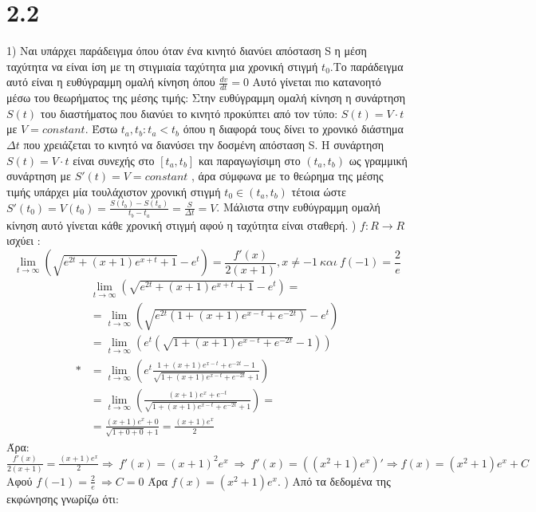 \documentclass{article}
\begin{document}
\section{2.2}
1) Ναι υπάρχει παράδειγμα όπου όταν ένα κινητό διανύει απόσταση S η μέση ταχύτητα να είναι ίση με τη στιγμιαία ταχύτητα μια χρονική στιγμή $t_0$.Το παράδειγμα αυτό είναι η ευθύγραμμη ομαλή κίνηση όπου $\frac{dv}{dt}=0$ Αυτό γίνεται πιο κατανοητό μέσω του θεωρήματος της μέσης τιμής: Στην ευθύγραμμη ομαλή κίνηση η συνάρτηση $S(t)$ του διαστήματος που διανύει το κινητό προκύπτει από τον τύπο: $S(t)=V\cdot t$ με $V=constant$. Έστω $t_a,t_b: t_a<t_b$ όπου η διαφορά τους δίνει το χρονικό διάστημα $Δt$ που χρειάζεται το κινητό να διανύσει την δοσμένη απόσταση S. Η συνάρτηση $S(t)=V\cdot t$ είναι συνεχής στο $[t_a,t_b]$ και παραγωγίσιμη στο $(t_a,t_b)$ ως γραμμική συνάρτηση με $S'(t)=V=constant$ , άρα σύμφωνα με το θεώρημα της μέσης τιμής υπάρχει μία τουλάχιστον χρονική στιγμή $t_0\in(t_a,t_b) $ τέτοια ώστε $S'(t_0)=V(t_0)=\frac{S(t_b)-S(t_a)}{t_b-t_a}=\frac{S}{Δt}=V$. Μάλιστα στην ευθύγραμμη ομαλή κίνηση αυτό γίνεται κάθε χρονική στιγμή αφού η ταχύτητα είναι σταθερή. ) $f:R \rightarrow R $ ισχύει :\newline 
$$\lim_{t\to\infty}(\sqrt{e^{2t} +(x+1)e^{x+t} + 1}-e^t)=\frac{f'(x)}{2(x+1)} , x\neq{-1}\: και\: f(-1)=\frac{2}{e}$$  \newline
\begin{align*}
&\lim_{t\to\infty}(\sqrt{e^{2t} +(x+1)e^{x+t} + 1}-e^t)= \\
&=\lim_{t\to\infty}(\sqrt{e^{2t}(1 +(x+1)e^{x-t} + e^{-2t})}-e^t) \\
&=\lim_{t\to\infty}(e^t(\sqrt{1+(x+1)e^{x-t}+e^{-2t}}-1)) \\*
&=\lim_{t\to\infty}(e^t\frac{1+(x+1)e^{x-t}+e^{-2t}-1}{\sqrt{1+(x+1)e^{x-t}+e^{-2t}}+1}) \\
&=\lim_{t\to\infty}(\frac{(x+1)e^x + e^{-t}}{\sqrt{1+(x+1)e^{x-t}+e^{-2t}}+1})= \\
&=\frac{(x+1)e^x+0}{\sqrt{1+0+0}+1}=\frac{(x+1)e^x}{2}
\end{align*}
\newline
Άρα: \: $\frac{f'(x)}{2(x+1)}=\frac{(x+1)e^x}{2} \Rightarrow \: f'(x)=(x+1)^2e^x \: \Rightarrow \: f'(x)=((x^2+1)e^x)' \Rightarrow f(x)=(x^2+1)e^x +C$ 
\newline Αφού \: $f(-1)=\frac{2}{e} \: \Rightarrow  C=0$ \newline Άρα $f(x)=(x^2+1)e^x.$
) Από τα δεδομένα της εκφώνησης γνωρίζω ότι:
\end{document}
